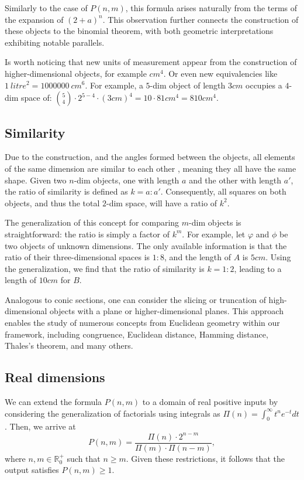 \documentclass{article}
\begin{document}
	Similarly to the case of $P(n,m)$, this formula arises naturally from the terms of the expansion of $(2 + a)^{n}$. This observation further connects the construction of these objects to the binomial theorem, with both geometric interpretations exhibiting notable parallels.
	
	Is worth noticing that new units of measurement appear from the construction of higher-dimensional objects, for example $cm^{4}$. Or even new equivalencies like $1\ litre^{2} = 1000000\ cm^{6}$. For example, a $5$-dim object of length $3cm$ occupies a $4$-dim space of: $\binom{5}{4} \cdot 2^{5-4} \cdot (3cm)^{4} = 10 \cdot  81 cm^{4} = 810 cm^{4}$.
	
	\subsection{Similarity}
	
	Due to the construction, and the angles formed between the objects, all elements of the same dimension are similar to each other \cite{euclid}, meaning they all have the same shape. Given two $n$-dim objects, one with length $a$ and the other with length $a'$, the ratio of similarity \cite{euclid} is defined as $k = a:a'$. Consequently, all squares on both objects, and thus the total $2$-dim space, will have a ratio of $k^{2}$.
	
	The generalization of this concept for comparing $m$-dim objects is straightforward: the ratio is simply a factor of $k^m$. For example, let $\varphi$ and $\phi$ be two objects of unknown dimensions. The only available information is that the ratio of their three-dimensional spaces is $1:8$, and the length of $A$ is $5cm$. Using the generalization, we find that the ratio of similarity is $k = 1:2$, leading to a length of $10cm$ for $B$.
	
	Analogous to conic sections, one can consider the slicing or truncation of high-dimensional objects \cite{coxeter1973regular} with a plane or higher-dimensional planes. This approach enables the study of numerous concepts from Euclidean geometry \cite{euclid} within our framework, including congruence, Euclidean distance, Hamming distance, Thales's theorem, and many others.
	
	
	\subsection{Real dimensions}
	
	We can extend the formula $P(n,m)$ to a domain of real positive inputs by considering the generalization of factorials using integrals as $\Pi(n)=\int_{0}^{\infty} t^n e^{-t} dt$ \cite{rice2007}. Then, we arrive at $$P(n,m)=\frac{\Pi(n) \cdot 2^{n-m}}{\Pi(m) \cdot \Pi(n-m)},$$
	where $n,m \in \mathbb{R}^{+}_{0}$ such that $n\geq m$. Given these restrictions, it follows that the output satisfies $P(n,m) \geq 1$. 
	
\end{document}
